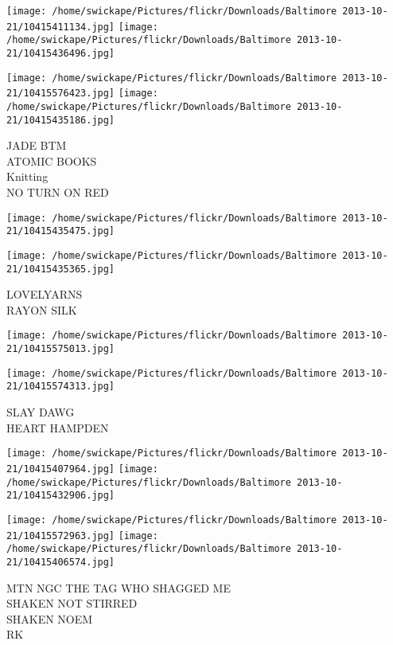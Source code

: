 \documentclass[10pt,letterpaper]{article}
\begin{document}
\texttt{[image: /home/swickape/Pictures/flickr/Downloads/Baltimore 2013-10-21/10415411134.jpg]}
\texttt{[image: /home/swickape/Pictures/flickr/Downloads/Baltimore 2013-10-21/10415436496.jpg]}

\texttt{[image: /home/swickape/Pictures/flickr/Downloads/Baltimore 2013-10-21/10415576423.jpg]}
\texttt{[image: /home/swickape/Pictures/flickr/Downloads/Baltimore 2013-10-21/10415435186.jpg]}

JADE BTM\\
ATOMIC BOOKS\\
Knitting\\
NO TURN ON RED\\
\pagebreak

\texttt{[image: /home/swickape/Pictures/flickr/Downloads/Baltimore 2013-10-21/10415435475.jpg]}

\vspace{0.25in}
\texttt{[image: /home/swickape/Pictures/flickr/Downloads/Baltimore 2013-10-21/10415435365.jpg]}

LOVELYARNS\\
RAYON SILK\\
\pagebreak

\texttt{[image: /home/swickape/Pictures/flickr/Downloads/Baltimore 2013-10-21/10415575013.jpg]}

\vspace{0.25in}
\texttt{[image: /home/swickape/Pictures/flickr/Downloads/Baltimore 2013-10-21/10415574313.jpg]}

SLAY DAWG\\
HEART HAMPDEN\\
\pagebreak

\texttt{[image: /home/swickape/Pictures/flickr/Downloads/Baltimore 2013-10-21/10415407964.jpg]}
\texttt{[image: /home/swickape/Pictures/flickr/Downloads/Baltimore 2013-10-21/10415432906.jpg]}

\texttt{[image: /home/swickape/Pictures/flickr/Downloads/Baltimore 2013-10-21/10415572963.jpg]}
\texttt{[image: /home/swickape/Pictures/flickr/Downloads/Baltimore 2013-10-21/10415406574.jpg]}

MTN NGC THE TAG WHO SHAGGED ME\\
SHAKEN NOT STIRRED\\
SHAKEN NOEM\\
RK\\
\pagebreak
\end{document}
